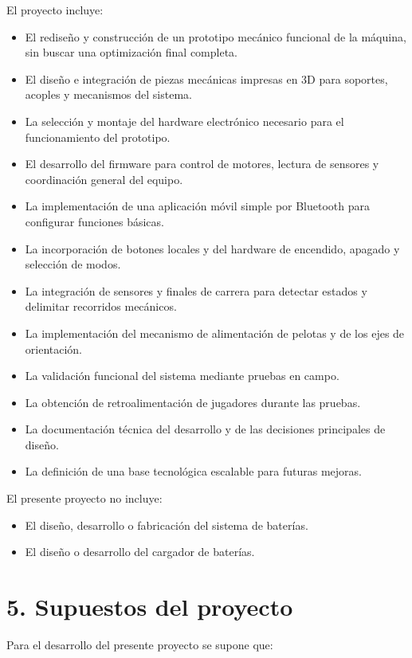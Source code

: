﻿\documentclass[
11pt, %
]{charter}
\begin{document}
El proyecto incluye:
\begin{itemize}
	\item El rediseño y construcción de un prototipo mecánico funcional de la máquina, sin buscar una optimización final completa.
	\item El diseño e integración de piezas mecánicas impresas en 3D para soportes, acoples y mecanismos del sistema.
	\item La selección y montaje del hardware electrónico necesario para el funcionamiento del prototipo.
	\item El desarrollo del firmware para control de motores, lectura de sensores y coordinación general del equipo.
	\item La implementación de una aplicación móvil simple por Bluetooth para configurar funciones básicas.
	\item La incorporación de botones locales y del hardware de encendido, apagado y selección de modos.
	\item La integración de sensores y finales de carrera para detectar estados y delimitar recorridos mecánicos.
	\item La implementación del mecanismo de alimentación de pelotas y de los ejes de orientación.
	\item La validación funcional del sistema mediante pruebas en campo.
	\item La obtención de retroalimentación de jugadores durante las pruebas.
	\item La documentación técnica del desarrollo y de las decisiones principales de diseño.
	\item La definición de una base tecnológica escalable para futuras mejoras.
\end{itemize}

El presente proyecto no incluye:
\begin{itemize}
	\item El diseño, desarrollo o fabricación del sistema de baterías.
	\item El diseño o desarrollo del cargador de baterías.
\end{itemize}


\section{5. Supuestos del proyecto}
\label{sec:supuestos}

Para el desarrollo del presente proyecto se supone que:
\end{document}
